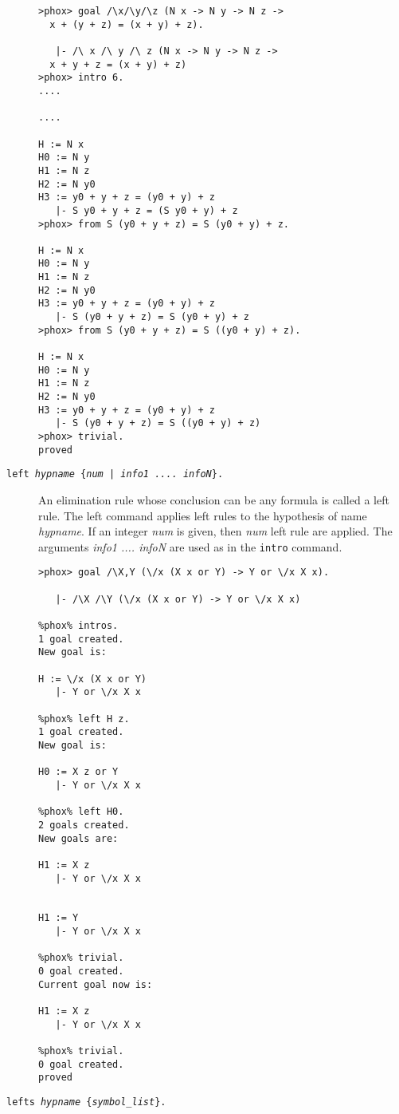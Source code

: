 \begin{description}
\begin{verbatim}
>phox> goal /\x/\y/\z (N x -> N y -> N z -> 
  x + (y + z) = (x + y) + z).

   |- /\ x /\ y /\ z (N x -> N y -> N z -> 
  x + y + z = (x + y) + z)
>phox> intro 6.
....

....

H := N x
H0 := N y
H1 := N z
H2 := N y0
H3 := y0 + y + z = (y0 + y) + z
   |- S y0 + y + z = (S y0 + y) + z
>phox> from S (y0 + y + z) = S (y0 + y) + z.

H := N x
H0 := N y
H1 := N z
H2 := N y0
H3 := y0 + y + z = (y0 + y) + z
   |- S (y0 + y + z) = S (y0 + y) + z
>phox> from S (y0 + y + z) = S ((y0 + y) + z).

H := N x
H0 := N y
H1 := N z
H2 := N y0
H3 := y0 + y + z = (y0 + y) + z
   |- S (y0 + y + z) = S ((y0 + y) + z)
>phox> trivial.
proved
\end{verbatim}


\item[{\tt left {\em hypname} \{{\em num} | {\em info1 .... infoN}\}.}\idx{left}]

  An elimination rule whose conclusion can be any formula is called a left
  rule. The left command applies left rules to the hypothesis of name {\em
  hypname}. If an integer {\em num} is given, then {\em num} left rule are
  applied. The arguments {\em info1 .... infoN} are used as in the
  {\tt intro} command.

  \begin{verbatim}
>phox> goal /\X,Y (\/x (X x or Y) -> Y or \/x X x).

   |- /\X /\Y (\/x (X x or Y) -> Y or \/x X x)

%phox% intros.
1 goal created.
New goal is:

H := \/x (X x or Y)
   |- Y or \/x X x

%phox% left H z.
1 goal created.
New goal is:

H0 := X z or Y
   |- Y or \/x X x

%phox% left H0.
2 goals created.
New goals are:

H1 := X z
   |- Y or \/x X x


H1 := Y
   |- Y or \/x X x

%phox% trivial.
0 goal created.
Current goal now is:

H1 := X z
   |- Y or \/x X x

%phox% trivial.
0 goal created.
proved
\end{verbatim}

\item[{\tt lefts {\em hypname} \{{\em symbol\_list}\}.}\idx{lefts}]


\end{description}
